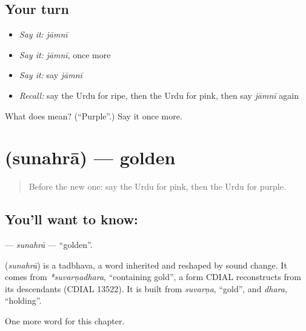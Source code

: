 \subsection*{Your turn}
\begin{itemize}
\raggedright
  \item \emph{Say it:} \emph{jāmnī}
  \item \emph{Say it:} \emph{jāmnī}, once more
  \item \emph{Say it:} say \emph{jāmnī}
  \item \emph{Recall:} say the Urdu for ripe, then the Urdu for pink, then say \emph{jāmnī} again
\end{itemize}

\begin{tcolorbox}[breakable,colback=teal!4,colframe=teal!35!black,title={Before you move on}]
What does  mean? (\textquotedblleft{}Purple\textquotedblright{}.) Say it once more.
\end{tcolorbox}
\section[\texorpdfstring{\ur{سنہرا} (sunahrā)}{سنہرا (sunahrā)}]{ (sunahrā) — golden}

\label{lesson:UR-C137-sunahra}



\begin{quote}
Before the new one: say the Urdu for pink, then the Urdu for purple.
\end{quote}

\subsection*{You'll want to know: }
\textbf{} — \emph{sunahrā} — \textquotedblleft{}golden\textquotedblright{}.

\begin{cousinweb}
\textbf{} (\emph{sunahrā}) is a tadbhava, a word inherited and reshaped by sound change. It comes from \emph{*suvarṇadhara}, \textquotedblleft{}containing gold\textquotedblright{}, a form CDIAL reconstructs from its descendants (CDIAL 13522). It is built from \emph{suvarṇa}, \textquotedblleft{}gold\textquotedblright{}, and \emph{dhara}, \textquotedblleft{}holding\textquotedblright{}.
\end{cousinweb}

\begin{grammarlens}[title={What you've built}]
One more word for this chapter.
\end{grammarlens}

